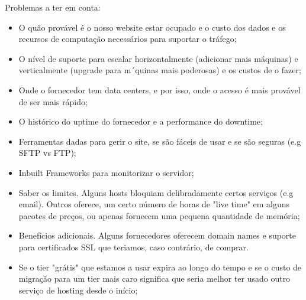 \documentclass{article}
\begin{document}
\begin{flushleft}
  Problemas a ter em conta:
  \begin{itemize}
    \item O quão provável é o nosso website estar ocupado e o custo dos dados e
    os recursos de computação necessários para suportar o tráfego;
    \item O nível de suporte para escalar horizontalmente (adicionar mais máquinas)
    e verticalmente (upgrade para m´quinas mais poderosas) e os custos de o fazer;
    \item Onde o fornecedor tem data centers, e por isso, onde o acesso é mais provável de ser mais rápido;
    \item O histórico do uptime do fornecedor e a performance do downtime;
    \item Ferramentas dadas para gerir o site, se são fáceis de usar e se são seguras (e.g SFTP vs FTP);
    \item Inbuilt Frameworks para monitorizar o servidor;
    \item Saber os limites. Alguns hosts bloquiam delibradamente certos serviços (e.g email).
    Outros oferece, um certo número de horas de "live time" em alguns pacotes de preços, ou apenas
    fornecem uma pequena quantidade de memória;
    \item Benefícios adicionais. Alguns fornecedores oferecem domain names e suporte para certificados SSL
    que teriamos, caso contrário, de comprar.
    \item Se o tier "grátis" que estamos a usar expira ao longo do tempo e se o custo de migração
    para um tier mais caro significa que seria melhor ter usado outro serviço de hosting desde o início;
  \end{itemize}
\end{flushleft}
\end{document}
